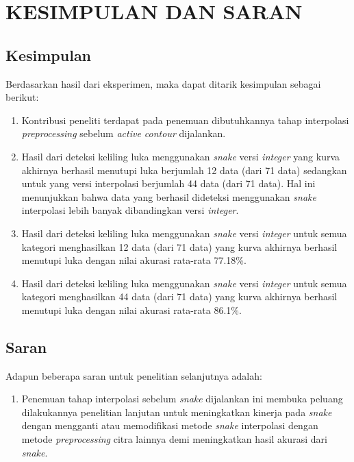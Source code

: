 
\chapter{KESIMPULAN DAN SARAN}

\section{Kesimpulan}
Berdasarkan hasil dari eksperimen, maka dapat ditarik kesimpulan sebagai berikut:
\begin{enumerate}
	\item Kontribusi peneliti terdapat pada penemuan dibutuhkannya tahap interpolasi \emph{preprocessing} sebelum \emph{active contour} dijalankan.
	\item Hasil dari deteksi keliling luka menggunakan \emph{snake} versi \emph{integer} yang kurva akhirnya berhasil menutupi luka berjumlah 12 data (dari 71 data) sedangkan untuk yang versi interpolasi berjumlah 44 data (dari 71 data). Hal ini menunjukkan bahwa data yang berhasil dideteksi menggunakan \emph{snake} interpolasi lebih banyak dibandingkan versi \emph{integer}.
	\item Hasil dari deteksi keliling luka menggunakan \emph{snake} versi \emph{integer} untuk semua kategori menghasilkan 12 data (dari 71 data) yang kurva akhirnya berhasil menutupi luka dengan nilai akurasi rata-rata 77.18\%.
	\item Hasil dari deteksi keliling luka menggunakan \emph{snake} versi \emph{integer} untuk semua kategori menghasilkan 44 data (dari 71 data) yang kurva akhirnya berhasil menutupi luka dengan nilai akurasi rata-rata 86.1\%.
\end{enumerate}

\section{Saran}
Adapun beberapa saran untuk penelitian selanjutnya adalah:
\begin{enumerate}
	\item Penemuan tahap interpolasi sebelum \emph{snake} dijalankan ini membuka peluang dilakukannya penelitian lanjutan untuk meningkatkan kinerja pada \emph{snake} dengan mengganti atau memodifikasi metode \emph{snake} interpolasi dengan metode \emph{preprocessing} citra lainnya demi meningkatkan hasil akurasi dari \emph{snake}.
\end{enumerate}
\begin{comment}

\end{comment}